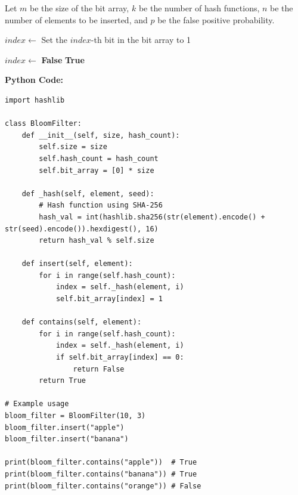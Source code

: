 \documentclass[12pt]{book} %
\begin{document}
Let \( m \) be the size of the bit array, \( k \) be the number of hash functions, \( n \) be the number of elements to be inserted, and \( p \) be the false positive probability.
\FloatBarrier
\begin{algorithm}
\caption{Insertion into Bloom Filter}
\begin{algorithmic}[1]
        \State $index \gets$ 
        \State Set the $index$-th bit in the bit array to 1
    \EndFor
\EndFunction
\end{algorithmic}
\end{algorithm}

\begin{algorithm}
\caption{Membership Test in Bloom Filter}
\begin{algorithmic}[1]
        \State $index \gets$ 
            \State \Return \textbf{False}
        \EndIf
    \EndFor
    \State \Return \textbf{True}
\EndFunction
\end{algorithmic}
\end{algorithm}
\FloatBarrier
\textbf{Python Code:}
\FloatBarrier
\begin{lstlisting}
import hashlib

class BloomFilter:
    def __init__(self, size, hash_count):
        self.size = size
        self.hash_count = hash_count
        self.bit_array = [0] * size

    def _hash(self, element, seed):
        # Hash function using SHA-256
        hash_val = int(hashlib.sha256(str(element).encode() + str(seed).encode()).hexdigest(), 16)
        return hash_val % self.size

    def insert(self, element):
        for i in range(self.hash_count):
            index = self._hash(element, i)
            self.bit_array[index] = 1

    def contains(self, element):
        for i in range(self.hash_count):
            index = self._hash(element, i)
            if self.bit_array[index] == 0:
                return False
        return True

# Example usage
bloom_filter = BloomFilter(10, 3)
bloom_filter.insert("apple")
bloom_filter.insert("banana")

print(bloom_filter.contains("apple"))  # True
print(bloom_filter.contains("banana")) # True
print(bloom_filter.contains("orange")) # False
\end{lstlisting}
\end{document}
